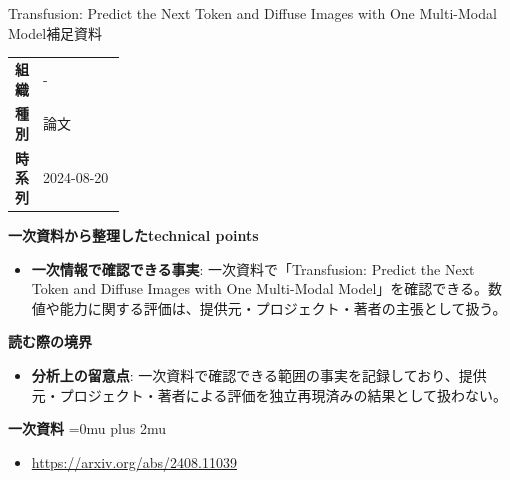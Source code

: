 \begin{technicalnote}{Transfusion: Predict the Next Token and Diffuse Images with One Multi-Modal Model}{補足資料}
\begingroup
\begin{tabularx}{\linewidth}{@{}>{\bfseries}p{0.22\linewidth}X@{}}
組織 & - \\
種別 & 論文 \\
時系列 & 2024-08-20 \\
\end{tabularx}
\smallskip
{\bfseries 一次資料から整理したtechnical points}
\begin{itemize}[leftmargin=1.5em,itemsep=0.35em]
\item \textbf{一次情報で確認できる事実}: 一次資料で「Transfusion: Predict the Next Token and Diffuse Images with One Multi-Modal Model」を確認できる。数値や能力に関する評価は、提供元・プロジェクト・著者の主張として扱う。
\end{itemize}
\begin{minipage}{\linewidth}
{\bfseries 読む際の境界}
\begin{itemize}[leftmargin=1.5em,itemsep=0.35em]
\item \textbf{分析上の留意点}: 一次資料で確認できる範囲の事実を記録しており、提供元・プロジェクト・著者による評価を独立再現済みの結果として扱わない。
\end{itemize}
\begin{samepage}
{\bfseries 一次資料}
\begingroup\sloppy
\Urlmuskip=0mu plus 2mu\relax
\begin{itemize}[leftmargin=1.5em,itemsep=0.25em]
\item {\scriptsize\url{https://arxiv.org/abs/2408.11039}}
\end{itemize}
\endgroup
\end{samepage}
\end{minipage}
\endgroup
\end{technicalnote}
\medskip

